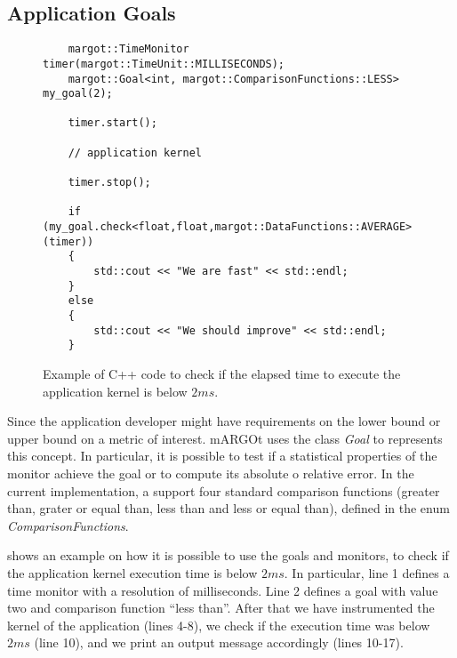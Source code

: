\subsection{Application Goals}

\begin{figure}[!t]
	\centering
	\lstset{language=MyCPP}
	\begin{lstlisting}
	margot::TimeMonitor timer(margot::TimeUnit::MILLISECONDS);
	margot::Goal<int, margot::ComparisonFunctions::LESS> my_goal(2);
	
	timer.start();
	
	// application kernel
	
	timer.stop();
	
	if (my_goal.check<float,float,margot::DataFunctions::AVERAGE>(timer))
	{
		std::cout << "We are fast" << std::endl;
	}
	else
	{
		std::cout << "We should improve" << std::endl;
	}
	\end{lstlisting}
	\caption{Example of C++ code to check if the elapsed time to execute the application kernel is below $2ms$.}
	\label{fig:goal_examples}
\end{figure}

Since the application developer might have requirements on the lower bound or upper bound on a metric of interest.
mARGOt uses the class \textit{Goal} to represents this concept.
In particular, it is possible to test if a statistical properties of the monitor achieve the goal or to compute its absolute o relative error.
In the current implementation, a support four standard comparison functions (greater than, grater or equal than, less than and less or equal than), defined in the enum \textit{ComparisonFunctions}.

 shows an example on how it is possible to use the goals and monitors, to check if the application kernel execution time is below $2ms$.
In particular, line 1 defines a time monitor with a resolution of milliseconds.
Line 2 defines a goal with value two and comparison function ``less than''.
After that we have instrumented the kernel of the application (lines 4-8), we check if the execution time was below $2ms$ (line 10), and we print an output message accordingly (lines 10-17). 

 
 

 